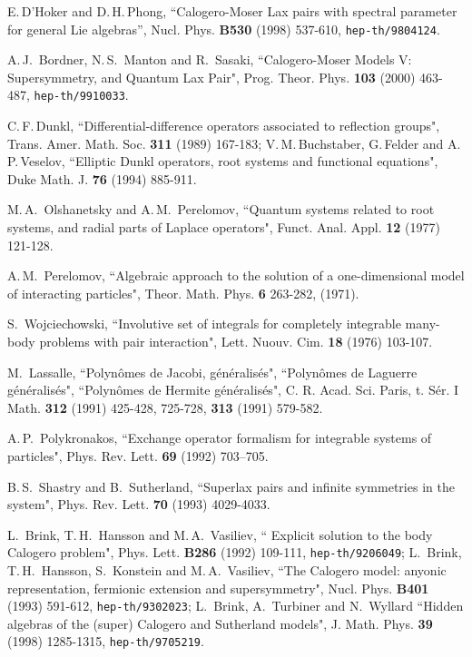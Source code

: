 \documentclass[a4paper,12pt]{article}
\begin{document}
\begin{thebibliography}{99}
E.\,D'Hoker and D.\,H.\,Phong, ``Calogero-Moser
Lax pairs with spectral parameter for general Lie algebras'',
Nucl. Phys. {\bf B530} (1998) 537-610, {\tt hep-th/9804124}.

  A.\,J.\, Bordner, N.\,S.\, Manton and R.\, Sasaki,
``Calogero-Moser Models V:  Supersymmetry,
and Quantum Lax Pair", Prog. Theor. Phys. {\bf 103} (2000) 463-487,
{\tt hep-th/9910033}.

C.\,F.\,Dunkl, ``Differential-difference operators associated to
reflection groups", Trans. Amer. Math. Soc. {\bf 311} (1989) 167-183;
V.\,M.\,Buchstaber, G.\,Felder and A.\,P.\,Veselov,
``Elliptic Dunkl operators, root systems and functional equations",
Duke Math. J. {\bf 76} (1994) 885-911.

M.\,A.\, Olshanetsky and A.\,M.\, Perelomov, ``Quantum systems
related to root systems, and radial parts of Laplace operators",
Funct. Anal. Appl. {\bf 12} (1977) 121-128.

A.\,M.\, Perelomov, ``Algebraic approach to the solution of a
one-dimensional model of interacting particles",
Theor. Math. Phys. {\bf 6} 263-282, (1971).

S.\, Wojciechowski, ``Involutive set of integrals for completely
integrable many-body problems with pair interaction",
Lett. Nuouv. Cim. {\bf 18} (1976) 103-107.

M.\, Lassalle, ``Polyn\^{o}mes de Jacobi,
g\'{e}n\'{e}ralis\'{e}s",  ``Polyn\^{o}mes de Laguerre
g\'{e}n\'{e}ralis\'{e}s", ``Polyn\^{o}mes de Hermite
g\'{e}n\'{e}ralis\'{e}s",  C. R. Acad. Sci. Paris, t. S\'er. I Math. {\bf
312} (1991) 425-428, 725-728, {\bf 313} (1991) 579-582.

A.\,P.\, Polykronakos, ``Exchange operator formalism for
integrable systems of particles",
Phys. Rev. Lett. {\bf 69} (1992)
703--705.

B.\,S.\, Shastry and B.\, Sutherland, ``Superlax pairs and infinite
symmetries
in the \coordHE{} system", Phys. Rev. Lett. {\bf 70} (1993) 4029-4033.

L.\, Brink, T.\,H.\, Hansson and M.\,A.\, Vasiliev, `` Explicit solution
to
the \coordHE{} body Calogero problem", Phys. Lett. {\bf B286} (1992) 109-111,
{\tt hep-th/9206049};
L.\, Brink, T.\,H.\, Hansson, S.\, Konstein and M.\,A.\, Vasiliev,
``The Calogero model: anyonic representation, fermionic extension and
supersymmetry", Nucl. Phys. {\bf B401} (1993) 591-612,
{\tt hep-th/9302023};
L.\, Brink, A.\, Turbiner and N.\, Wyllard ``Hidden algebras of the
(super) Calogero and Sutherland models", J. Math. Phys. {\bf 39} (1998)
1285-1315,  {\tt hep-th/9705219}.


\end{thebibliography}
\end{document}
